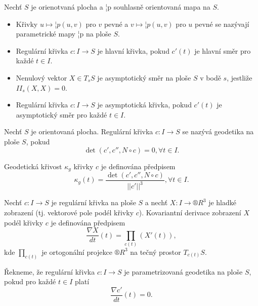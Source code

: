 \documentclass[12pt]{article}                   %
\begin{document}
        \begin{definice}
            Nechť $S$ je orienotvaná plocha a ¦p souhlasně orientovaná mapa na $S$.

            \begin{itemize}
                \item Křivky $u \mapsto ¦p(u, v)$ pro $v$ pevné a $v \mapsto ¦p(u, v)$ pro $u$ pevné se nazývají parametrické mapy ¦p na ploše $S$.
                \item Regulární křivka $c: I \rightarrow S$ je hlavní křivka, pokud $c'(t)$ je hlavní směr pro každé $t \in I$.
                \item Nenulový vektor $X \in T_sS$ je asymptotický směr na ploše $S$ v bodě $s$, jestliže $II_s(X, X) = 0$.
                \item Regulární křivka $c: I \rightarrow S$ je asymptotická křivka, pokud $c'(t)$ je asymptotický směr pro každé $t \in I$.
            \end{itemize}
        \end{definice}

        \begin{definice}
            Nechť $S$ je orientovaná plocha. Regulární křivka $c: I \rightarrow S$ se nazývá geodetika na ploše $S$, pokud
            $$ \det(c', c'', N \circ c) = 0, \forall t \in I. $$

            Geodetická křivost $\kappa_g$ křivky $c$ je definována předpisem
            $$ \kappa_g(t) = \frac{\det(c', c'', N \circ c)}{||c'||^3}, \forall t \in I. $$ 
        \end{definice}

        \begin{definice}
            Nechť $c: I \rightarrow S$ je regulární křivka na ploše $S$ a nechť $X: I \rightarrow ®R^3$ je hladké zobrazení (tj. vektorové pole podél křivky $c$). Kovariantní derivace zobrazení $X$ podél křivky $c$ je definována předpisem
            $$ \frac{\nabla X}{dt}(t) = \prod_{c(t)}(X'(t)), $$
            kde $\prod_{c(t)}$ je ortogonální projekce $®R^3$ na tečný prostor $T_{c(t)}S$.
        \end{definice}

        \begin{definice}
            Řekneme, že regulární křivka $c: I \rightarrow S$ je parametrizovaná geodetika na ploše $S$, pokud pro každé $t \in I$ platí
            $$ \frac{\nabla c'}{dt}(t) = 0. $$ 
        \end{definice}
\end{document}
